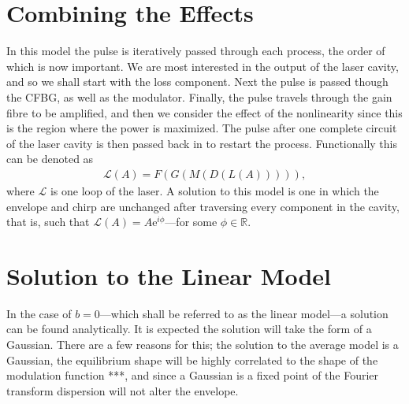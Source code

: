\section{Combining the Effects}
In this model the pulse is iteratively passed through each process, the order of which is now important. We are most interested in the output of the laser cavity, and so we shall start with the loss component. Next the pulse is passed though the CFBG, as well as the modulator. Finally, the pulse travels through the gain fibre to be amplified, and then we consider the effect of the nonlinearity since this is the region where the power is maximized. The pulse after one complete circuit of the laser cavity is then passed back in to restart the process. Functionally this can be denoted as
\begin{align*}
	\mathcal{L}(A) = F(G(M(D(L(A))))),
\end{align*}
where $\mathcal{L}$ is one loop of the laser. A solution to this model is one in which the envelope and chirp are unchanged after traversing every component in the cavity, that is, such that $\mathcal{L}(A) = A \textrm{e}^{i \phi}$---for some $\phi \in \mathbb{R}$.

\section{Solution to the Linear Model}
\label{sec:linear}
In the case of $b = 0$---which shall be referred to as the linear model---a solution can be found analytically. It is expected the solution will take the form of a Gaussian. There are a few reasons for this; the solution to the average model is a Gaussian, the equilibrium shape will be highly correlated to the shape of the modulation function ***, and since a Gaussian is a fixed point of the Fourier transform \cite{integrals} dispersion will not alter the envelope. \\

